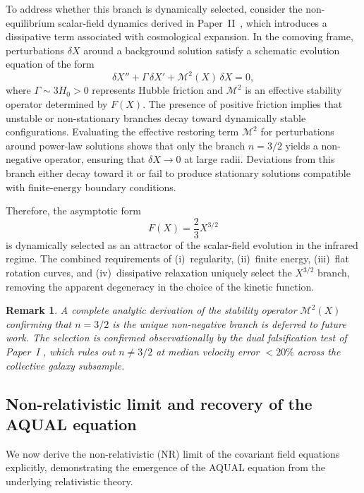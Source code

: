 \documentclass[11pt,a4paper]{article}
\newtheorem{remark}{Remark}[section]
\begin{document}
To address whether this branch is dynamically selected, consider the
non-equilibrium scalar-field dynamics derived in Paper~II~\cite{PaperII},
which introduces a dissipative term associated with cosmological expansion.
In the comoving frame, perturbations $\delta X$ around a background solution
satisfy a schematic evolution equation of the form
\begin{equation}
  \delta X'' + \Gamma\,\delta X' + \mathcal{M}^2(X)\,\delta X = 0,
\end{equation}
where $\Gamma \sim 3H_0 > 0$ represents Hubble friction and $\mathcal{M}^2$
is an effective stability operator determined by $F(X)$.
The presence of positive friction implies that unstable or non-stationary
branches decay toward dynamically stable configurations. Evaluating the
effective restoring term $\mathcal{M}^2$ for perturbations around power-law
solutions shows that only the branch $n = 3/2$ yields a non-negative operator,
ensuring that $\delta X \to 0$ at large radii. Deviations from this branch
either decay toward it or fail to produce stationary solutions compatible
with finite-energy boundary conditions.

Therefore, the asymptotic form
\begin{equation}
  F(X) = \frac{2}{3}X^{3/2}
\end{equation}
is dynamically selected as an attractor of the scalar-field evolution in
the infrared regime. The combined requirements of (i)~regularity,
(ii)~finite energy, (iii)~flat rotation curves, and (iv)~dissipative relaxation
uniquely select the $X^{3/2}$ branch, removing the apparent degeneracy in the
choice of the kinetic function.

\begin{remark}
A complete analytic derivation of the stability operator $\mathcal{M}^2(X)$
confirming that $n=3/2$ is the unique non-negative branch is deferred to
future work.  The selection is confirmed observationally by the dual falsification
test of Paper~I \cite{PaperI}, which rules out $n\neq 3/2$ at median velocity
error $<20\%$ across the collective galaxy subsample.
\end{remark}

\subsection{Non-relativistic limit and recovery of the AQUAL equation}
\label{subsec:NR_limit}

We now derive the non-relativistic (NR) limit of the covariant field equations
explicitly, demonstrating the emergence of the AQUAL equation from the underlying
relativistic theory.
\end{document}
